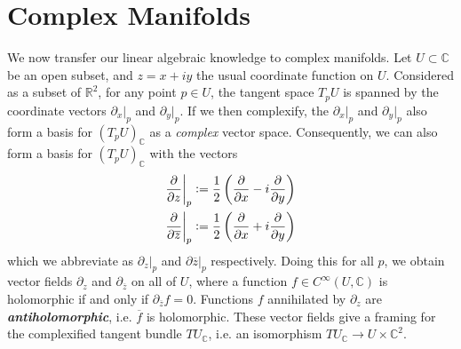 \documentclass[psamsfonts, 12pt]{amsart}
\theoremstyle{definition}
\theoremstyle{remark}
\newcommand{\R}{\mathbb{R}}
\newcommand{\ib}[1]{\textbf{\textit{#1}}}
\newcommand{\C}{\mathbb{C}}
\newcommand{\defeq}{\vcentcolon=}
\begin{document}
\section{Complex Manifolds}
%
We now transfer our linear algebraic knowledge to complex manifolds. Let $U \subset \C$
be an open subset, and $z = x + iy$ the usual coordinate function on $U$. Considered
as a subset of $\R^2$, for any point $p \in U$, the tangent space $T_pU$ is spanned by
the coordinate vectors $\partial_x\vert_p$ and $\partial_y\vert_p$. If we then
complexify, the $\partial_x\vert_p$ and $\partial_y\vert_p$ also form a basis for
$(T_pU)_\C$ as a \emph{complex} vector space. Consequently, we can also form a
basis for $(T_pU)_\C$ with the vectors
%
\begin{align*}
\frac{\partial}{\partial z}\bigg\vert_p &\defeq
\frac{1}{2}\left(\frac{\partial}{\partial x} - i\frac{\partial}{\partial y}\right) \\
\frac{\partial}{\partial\overline{z}}\bigg\vert_p &\defeq
\frac{1}{2}\left( \frac{\partial}{\partial x} + i\frac{\partial}{\partial y}\right)
\end{align*}
%
which we abbreviate as $\partial_z\vert_p$ and $\partial{\overline{z}}\vert_p$
respectively. Doing this for all $p$, we obtain vector fields $\partial_z$ and
$\partial_{\overline{z}}$ on all of $U$, where a function $f \in C^\infty(U, \C)$ is
holomorphic if and only if $\partial_{\overline{z}}f = 0$. Functions $f$ annihilated by
$\partial_z$ are \ib{antiholomorphic}, i.e. $\overline{f}$ is holomorphic. These
vector fields give a framing for the complexified tangent bundle $TU_\C$, i.e. an
isomorphism $TU_\C \to U \times \C^2$. \\
\end{document}
